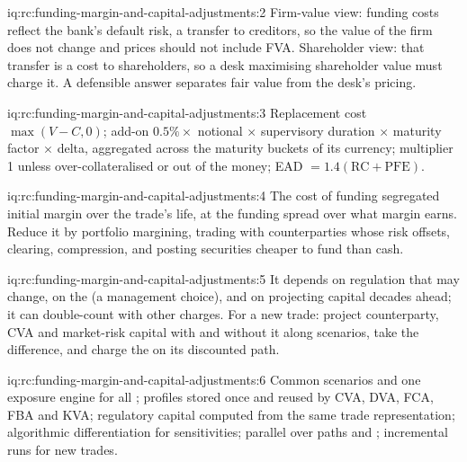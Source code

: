 \begin{solution}{iq:rc:funding-margin-and-capital-adjustments:2}
Firm-value view: funding costs reflect the bank's default risk, a transfer to creditors, so the
value of the firm does not change and prices should not include FVA. Shareholder view: that
transfer is a cost to shareholders, so a desk maximising shareholder value must charge it. A
defensible answer separates fair value from the desk's pricing.
\end{solution}

\begin{solution}{iq:rc:funding-margin-and-capital-adjustments:3}
Replacement cost $\max(V-C,0)$; add-on $0.5\%\times$ notional $\times$ supervisory duration
$\times$ maturity factor $\times$ delta, aggregated across the maturity buckets of its currency;
multiplier 1 unless over-collateralised or out of the money; EAD $= 1.4(\mathrm{RC}+\mathrm{PFE})$.
\end{solution}

\begin{solution}{iq:rc:funding-margin-and-capital-adjustments:4}
The cost of funding segregated initial margin over the trade's life, at the funding spread over
what margin earns. Reduce it by portfolio margining, trading with counterparties whose risk
offsets, clearing, compression, and posting securities cheaper to fund than cash.
\end{solution}

\begin{solution}{iq:rc:funding-margin-and-capital-adjustments:5}
It depends on regulation that may change, on the  (a management choice), and on
projecting capital decades ahead; it can double-count with other charges. For a new trade:
project counterparty, CVA and market-risk capital with and without it along scenarios, take the
difference, and charge the  on its discounted path.
\end{solution}

\begin{solution}{iq:rc:funding-margin-and-capital-adjustments:6}
Common scenarios and one exposure engine for all ; profiles stored once and reused by
CVA, DVA, FCA, FBA and KVA; regulatory capital computed from the same trade representation;
algorithmic differentiation for sensitivities; parallel over paths and ; incremental
runs for new trades.
\end{solution}
